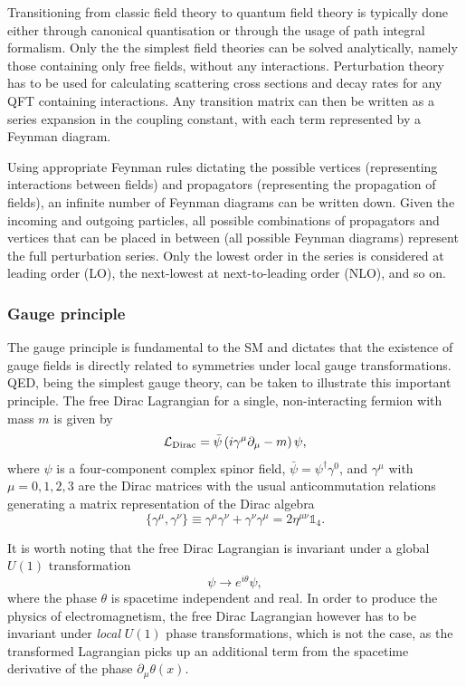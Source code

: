 Transitioning from classic field theory to quantum field theory is typically done either through canonical quantisation or through the usage of path integral formalism. Only the the simplest field theories can be solved analytically, namely those containing only free fields, without any interactions. Perturbation theory has to be used for calculating scattering cross sections and decay rates for any QFT containing interactions. Any transition matrix can then be written as a series expansion in the coupling constant, with each term represented by a Feynman diagram. 

Using appropriate Feynman rules dictating the possible vertices (representing interactions between fields) and propagators (representing the propagation of fields), an infinite number of Feynman diagrams can be written down. Given the incoming and outgoing particles, all possible combinations of propagators and vertices that can be placed in between (\ie all possible Feynman diagrams) represent the full perturbation series. Only the lowest order in the series is considered at leading order (LO), the next-lowest at next-to-leading order (NLO), and so on. 


\subsubsection{Gauge principle}
\label{sec:gauge_principle}

The gauge principle is fundamental to the SM and dictates that the existence of gauge fields is directly related to symmetries under local gauge transformations. QED, being the simplest gauge theory, can be taken to illustrate this important principle. The free Dirac Lagrangian for a single, non-interacting fermion with mass $m$ is given by
\begin{equation}
	\mathcal{L}_\mathrm{Dirac}=\bar{\psi}\left(i\gamma^\mu\partial_\mu - m\right)\psi,
	\label{eq:dirac_lagrangian}
\end{equation}
where $\psi$ is a four-component complex spinor field, $\bar{\psi} = \psi^\dagger\gamma^0$, and $\gamma^\mu$ with $\mu = 0,1,2,3 $ are the Dirac matrices with the usual anticommutation relations generating a matrix representation of the Dirac algebra 
\begin{equation}
	\{\gamma^\mu,\gamma^\nu\} \equiv \gamma^\mu\gamma^\nu + \gamma^\nu\gamma^\mu = 2\eta^{\mu\nu}\mathbb{1}_4.
\end{equation}

It is worth noting that the free Dirac Lagrangian is invariant under a global $U(1)$ transformation
\begin{equation}
	\psi \rightarrow e^{i\theta}\psi,
\end{equation}
where the phase $\theta$ is spacetime independent and real. In order to produce the physics of electromagnetism, the free Dirac Lagrangian however has to be invariant under \textit{local} $U(1)$ phase transformations, which is not the case, as the transformed Lagrangian picks up an additional term from the spacetime derivative of the phase $\partial_\mu\theta(x)$.

